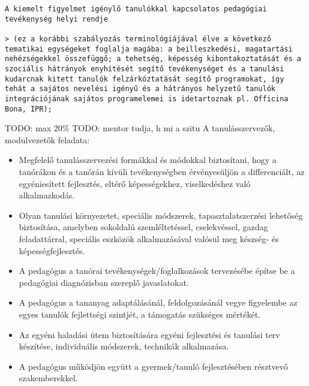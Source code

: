 \begin{verbatim}
A kiemelt figyelmet igénylő tanulókkal kapcsolatos pedagógiai tevékenység helyi rendje

> (ez a korábbi szabályozás terminológiájával élve a következő tematikai egységeket foglalja magába: a beilleszkedési, magatartási nehézségekkel összefüggő; a tehetség, képesség kibontakoztatását és a szociális hátrányok enyhítését segítő tevékenységet és a tanulási kudarcnak kitett tanulók felzárkóztatását segítő programokat, így tehát a sajátos nevelési igényű és a hátrányos helyzetű tanulók integrációjának sajátos programelemei is idetartoznak pl. Officina Bona, IPR);
\end{verbatim}

TODO: max 20\% TODO: mentor tudja, h mi a szitu
A tanulásszervezők, modulvezetők feladata:

\begin{itemize}
  \item
        Megfelelő tanulásszervezési formákkal és módokkal biztosítani, hogy a
        tanórákon és a tanórán kívüli tevékenységben érvényesüljön a
        differenciált, az egyéniesített fejlesztés, eltérő képességekhez,
        viselkedéshez való alkalmazkodás.
  \item
        Olyan tanulási környezetet, speciális módszerek, tapasztalatszerzési
        lehetőség biztosítása, amelyben sokoldalú szemléltetéssel,
        cselekvéssel, gazdag feladattárral, speciális eszközök alkalmazásával
        valósul meg készség- és képességfejlesztés.
  \item
        A pedagógus a tanórai tevékenységek/foglalkozások tervezésébe építse
        be a pedagógiai diagnózisban szereplő javaslatokat.
  \item
        A pedagógus a tananyag adaptálásánál, feldolgozásánál vegye figyelembe
        az egyes tanulók fejlettségi szintjét, a támogatás szükséges mértékét.
  \item
        Az egyéni haladási ütem biztosítására egyéni fejlesztési és tanulási
        terv készítése, individuális módszerek, technikák alkalmazása.
  \item
        A pedagógus működjön együtt a gyermek/tanuló fejlesztésében résztvevő
        szakemberekkel.
\end{itemize}